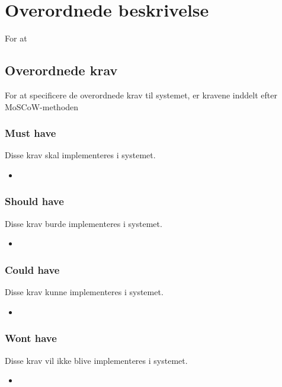 \chapter{Overordnede beskrivelse}
For at

\section{Overordnede krav}

For at specificere de overordnede krav til systemet, er kravene inddelt efter MoSCoW-methoden %

\subsection{Must have}

Disse krav skal implementeres i systemet.

\begin{itemize}
    \item 
\end{itemize}

\subsection{Should have}

Disse krav burde implementeres i systemet.

\begin{itemize}
    \item 
\end{itemize}

\subsection{Could have}

Disse krav kunne implementeres i systemet.

\begin{itemize}
    \item 
\end{itemize}

\subsection{Wont have}

Disse krav vil ikke blive implementeres i systemet.

\begin{itemize}
    \item 
\end{itemize}


